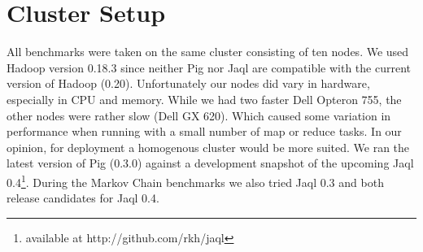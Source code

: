\section{Cluster Setup}

All benchmarks were taken on the same cluster consisting of ten nodes. We used Hadoop version 0.18.3 since neither
Pig nor Jaql are compatible with the current version of Hadoop (0.20). Unfortunately our nodes did vary in hardware,
especially in CPU and memory. While we had two faster Dell Opteron 755, the other nodes were rather slow (Dell GX 620).
Which caused some variation in performance when running with a small number of map or reduce tasks. In our opinion,
for deployment a homogenous cluster would be more suited. We ran the latest version of Pig (0.3.0) against a development
snapshot of the upcoming Jaql 0.4\footnote{available at http://github.com/rkh/jaql}. During the Markov Chain benchmarks
we also tried Jaql 0.3 and both release candidates for Jaql 0.4.